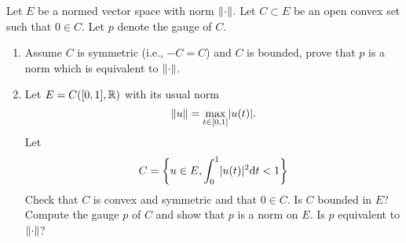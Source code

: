 \documentclass[a4paper, 10pt]{article}
\begin{document}
\begin{problem} 
    Let $E$ be a normed vector space with norm $\lVert\cdot\rVert$. Let $C \subset E$ be an open convex set such that $0 \in C$. Let $p$ denote the gauge of $C$.
    \begin{enumerate}
    \item Assume $C$ is symmetric (i.e., $-C = C$) and $C$ is bounded, prove that $p$ is a norm which is equivalent to $\lVert\cdot\rVert$.
    \item Let $E = C([0, 1], \mathbb{R})$ with its usual norm \begin{equation*}
    \lVert u\rVert = \max_{t \in [0, 1]} \lvert u(t)\rvert.
    \end{equation*}
    Let \begin{equation*}
    C = \left\{u \in E, \int_{0}^{1} \lvert u(t)\rvert^2 \mathrm{d} t < 1\right\}
    \end{equation*}
    Check that $C$ is convex and symmetric and that $0 \in C$. Is $C$ bounded in $E$? Compute the gauge $p$ of $C$ and show that $p$ is a norm on $E$. Is $p$ equivalent to $\lVert\cdot\rVert$?
    \end{enumerate}
\end{problem}
\end{document}
